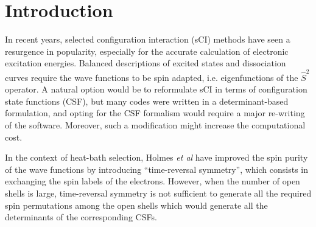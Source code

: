 \documentclass[aip,jcp,reprint,showkeys]{revtex4-1}
\newcommand{\stwo}{\hat{S}^2}
\newcommand{\csf}{CSF}
\newcommand{\sci}{sCI}
\begin{document}
\section{Introduction}

In recent years, selected configuration interaction ({\sci}) methods have seen a resurgence in
popularity,\cite{Greer_1998,Stampfuss_2005,Bytautas_2009,Booth_2009,Giner_2013,Buenker_2014,Holmes_2016,Ohtsuka_2017,Coe_2018,Scemama_2018a}
especially for the accurate calculation of electronic excitation
energies.\cite{Coe_2013,Schriber_2017,Holmes_2017,Loos_2018,Scemama_2018,Dash_2018,Chien_2018,Loos_2018a}
Balanced descriptions of excited states and dissociation curves require
the wave functions to be spin adapted, i.e. eigenfunctions of the $\stwo$
operator. A natural option would be to reformulate {\sci} in terms of
configuration state functions ({\csf}), but many codes were written in a
determinant-based formulation, and opting for the {\csf} formalism would require
a major re-writing of the software. Moreover, such a modification might
increase the computational cost.\cite{Knowles_1984,Olsen_1988}

In the context of heat-bath selection, Holmes \textit{et al} have 
improved the spin purity of the wave functions by introducing ``time-reversal
symmetry'', \cite{Holmes_2017} which consists in exchanging the spin labels of
the electrons.
However, when the number of open shells is large, time-reversal symmetry is not
sufficient to generate all the required spin permutations among the open shells
which would generate all the determinants of the corresponding {\csf s}.
\end{document}
